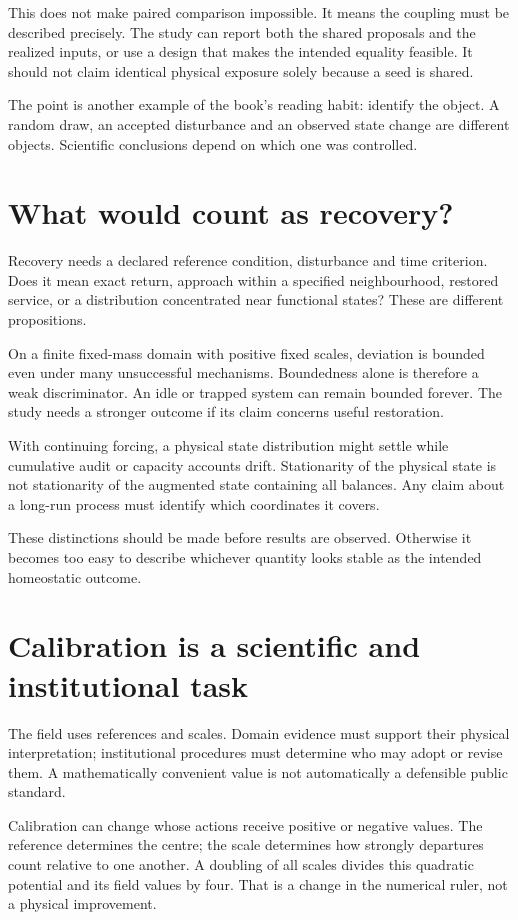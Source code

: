 This does not make paired comparison impossible. It means the coupling must be described precisely. The study can report both the shared proposals and the realized inputs, or use a design that makes the intended equality feasible. It should not claim identical physical exposure solely because a seed is shared.

The point is another example of the book's reading habit: identify the object. A random draw, an accepted disturbance and an observed state change are different objects. Scientific conclusions depend on which one was controlled.

\section{What would count as recovery?}
Recovery needs a declared reference condition, disturbance and time criterion. Does it mean exact return, approach within a specified neighbourhood, restored service, or a distribution concentrated near functional states? These are different propositions.

On a finite fixed-mass domain with positive fixed scales, deviation is bounded even under many unsuccessful mechanisms. Boundedness alone is therefore a weak discriminator. An idle or trapped system can remain bounded forever. The study needs a stronger outcome if its claim concerns useful restoration.

With continuing forcing, a physical state distribution might settle while cumulative audit or capacity accounts drift. Stationarity of the physical state is not stationarity of the augmented state containing all balances. Any claim about a long-run process must identify which coordinates it covers.

These distinctions should be made before results are observed. Otherwise it becomes too easy to describe whichever quantity looks stable as the intended homeostatic outcome.

\section{Calibration is a scientific and institutional task}
The field uses references and scales. Domain evidence must support their physical interpretation; institutional procedures must determine who may adopt or revise them. A mathematically convenient value is not automatically a defensible public standard.

Calibration can change whose actions receive positive or negative values. The reference determines the centre; the scale determines how strongly departures count relative to one another. A doubling of all scales divides this quadratic potential and its field values by four. That is a change in the numerical ruler, not a physical improvement.

